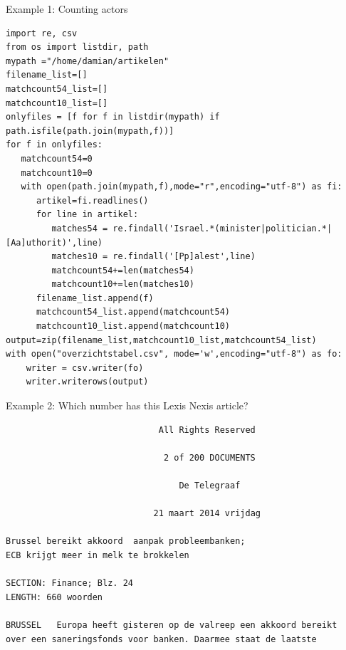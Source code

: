 \documentclass{beamer}
\begin{document}
\begin{frame}{Example 1: Counting actors}
\begin{lstlisting}
import re, csv
from os import listdir, path
mypath ="/home/damian/artikelen"
filename_list=[]
matchcount54_list=[]
matchcount10_list=[]
onlyfiles = [f for f in listdir(mypath) if path.isfile(path.join(mypath,f))]
for f in onlyfiles:
   matchcount54=0
   matchcount10=0
   with open(path.join(mypath,f),mode="r",encoding="utf-8") as fi:
      artikel=fi.readlines()
      for line in artikel:
         matches54 = re.findall('Israel.*(minister|politician.*|[Aa]uthorit)',line)
         matches10 = re.findall('[Pp]alest',line)         
         matchcount54+=len(matches54)
         matchcount10+=len(matches10)
      filename_list.append(f)
      matchcount54_list.append(matchcount54)
      matchcount10_list.append(matchcount10)
output=zip(filename_list,matchcount10_list,matchcount54_list)
with open("overzichtstabel.csv", mode='w',encoding="utf-8") as fo:
    writer = csv.writer(fo)
    writer.writerows(output)
\end{lstlisting}
\end{frame}




\begin{frame}[fragile]{Example 2: Which number has this Lexis Nexis article?}
\begin{lstlisting}
                              All Rights Reserved

                               2 of 200 DOCUMENTS

                                  De Telegraaf

                             21 maart 2014 vrijdag

Brussel bereikt akkoord  aanpak probleembanken;
ECB krijgt meer in melk te brokkelen

SECTION: Finance; Blz. 24
LENGTH: 660 woorden

BRUSSEL   Europa heeft gisteren op de valreep een akkoord bereikt 
over een saneringsfonds voor banken. Daarmee staat de laatste
\end{lstlisting}

\end{frame}
\end{document}
